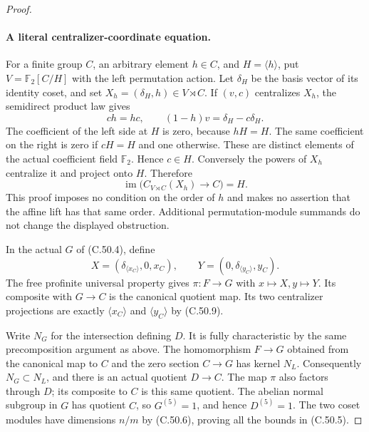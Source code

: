 \begin{proof}
\paragraph{A literal centralizer-coordinate equation.}
For a finite group $C$, an arbitrary element $h\in C$, and
$H=\langle h\rangle$, put $V=\mathbb F_2[C/H]$ with the
left permutation action. Let $\delta_H$ be the basis vector of
its identity coset, and set $X_h=(\delta_H,h)\in V\rtimes C$.
If $(v,c)$ centralizes $X_h$, the semidirect product law gives
\[
      ch=hc,\qquad (1-h)v=\delta_H-c\delta_H.          \tag{C.50.8}
\]
The coefficient of the left side at $H$ is zero, because $hH=H$.
The same coefficient on the right is zero if $cH=H$ and one
otherwise. These are distinct elements of the actual coefficient
field $\mathbb F_2$. Hence $c\in H$. Conversely the powers of
$X_h$ centralize it and project onto $H$. Therefore
\[
       \operatorname{im}\bigl(C_{V\rtimes C}(X_h)\to C\bigr)=H.
                                                               \tag{C.50.9}
\]
This proof imposes no condition on the order of $h$ and makes no
assertion that the affine lift has that same order. Additional
permutation-module summands do not change the displayed obstruction.

In the actual $G$ of (C.50.4), define
\[
 X=(\delta_{\langle x_C\rangle},0,x_C),\qquad
 Y=(0,\delta_{\langle y_C\rangle},y_C).
                                                               \tag{C.50.10}
\]
The free profinite universal property gives $\pi:F\to G$ with
$x\mapsto X,y\mapsto Y$. Its composite with $G\to C$ is the
canonical quotient map. Its two centralizer projections are exactly
$\langle x_C\rangle$ and $\langle y_C\rangle$ by (C.50.9).

Write $N_G$ for the intersection defining $D$. It is fully
characteristic by the same precomposition argument as above.
The homomorphism $F\to G$ obtained from the canonical map to $C$
and the zero section $C\to G$ has kernel $N_L$. Consequently
$N_G\subset N_L$, and there is an actual quotient $D\to C$.
The map $\pi$ also factors through $D$; its composite to $C$ is
this same quotient. The abelian normal subgroup in $G$ has
quotient $C$, so $G^{(5)}=1$, and hence $D^{(5)}=1$.
The two coset modules have dimensions $n/m$ by (C.50.6), proving
all the bounds in (C.50.5).


\end{proof}
